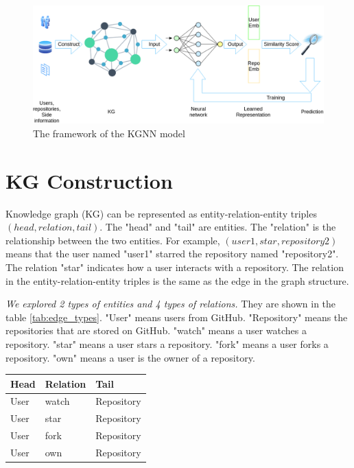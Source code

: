 \documentclass[11pt,twoside]{report}
\begin{document}
\begin{figure}[H]
    \centering
    \includegraphics[scale=0.4]{KGCN Overview.png}
    \caption{The framework of the KGNN model}
    \label{fig:kgnn_framework}
\end{figure}

\section{KG Construction}
Knowledge graph (KG) can be represented as entity-relation-entity triples $(head, relation, tail)$. The "head" and "tail" are entities. The "relation" is the relationship between the two entities. For example, $(user1, star, repository2)$ means that the user named "user1" starred the repository named "repository2". The relation "star" indicates how a user interacts with a repository. The relation in the entity-relation-entity triples is the same as the edge in the graph structure.

\textit{We explored 2 types of entities and 4 types of relations.} They are shown in the table \ref{tab:edge_types}. "User" means users from GitHub. "Repository" means the repositories that are stored on GitHub. "watch" means a user watches a repository. "star" means a user stars a repository. "fork" means a user forks a repository. "own" means a user is the owner of a repository. 

\begin{center}
    \begin{tabular}{l | l | l}
    \hline
    Head & Relation & Tail \\
    \hline
    User & watch & Repository \\
    User & star & Repository \\
    User & fork & Repository \\
    User & own & Repository \\
    \end{tabular}
    \label{tab:edge_types}
\end{center}
\end{document}
